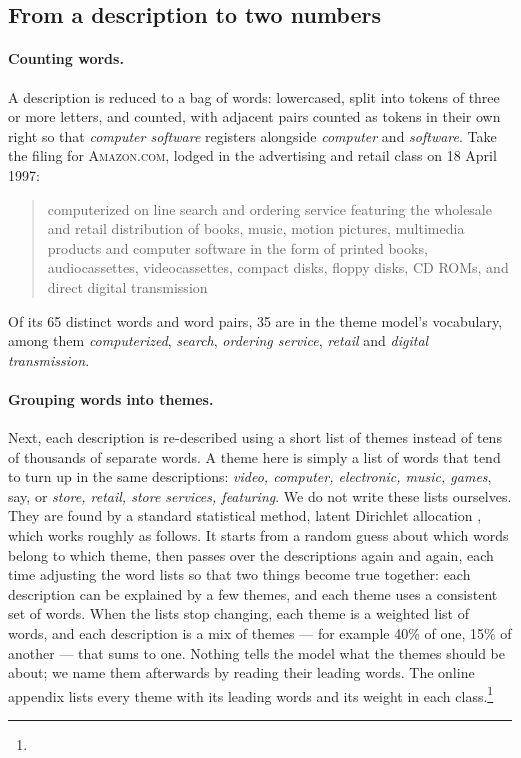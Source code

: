 \subsection{From a description to two numbers}\label{sec:definitions}

\paragraph{Counting words.} A description is reduced to a bag of words:
lowercased, split into tokens of three or more letters, and counted,
with adjacent pairs counted as tokens in their own right so that
\emph{computer software} registers alongside \emph{computer} and
\emph{software}. Take the filing for \textsc{Amazon.com}, lodged in the
advertising and retail class on 18 April 1997:

\begin{quote}\small
computerized on line search and ordering service featuring the wholesale
and retail distribution of books, music, motion pictures, multimedia
products and computer software in the form of printed books,
audiocassettes, videocassettes, compact disks, floppy disks, CD ROMs,
and direct digital transmission
\end{quote}

\noindent Of its 65 distinct words and word pairs, 35 are in the theme
model's vocabulary, among them \emph{computerized}, \emph{search},
\emph{ordering service}, \emph{retail} and \emph{digital transmission}.

\paragraph{Grouping words into themes.} Next, each description is
re-described using a short list of themes instead of tens of thousands of
separate words. A theme here is simply a list of words that tend to turn
up in the same descriptions: \emph{video, computer, electronic, music,
games}, say, or \emph{store, retail, store services, featuring}. We do not
write these lists ourselves. They are found by a standard statistical
method, latent Dirichlet allocation \citep{Blei2003}, which works roughly
as follows. It starts from a random guess about which words belong to
which theme, then passes over the descriptions again and again, each time
adjusting the word lists so that two things become true together: each
description can be explained by a few themes, and each theme uses a
consistent set of words. When the lists stop changing, each theme is a
weighted list of words, and each description is a mix of themes --- for
example 40\% of one, 15\% of another --- that sums to one. Nothing tells
the model what the themes should be about; we name them afterwards by
reading their leading words. The online appendix lists every theme with
its leading words and its weight in each class.\footnote{\onlineappendixnote}

